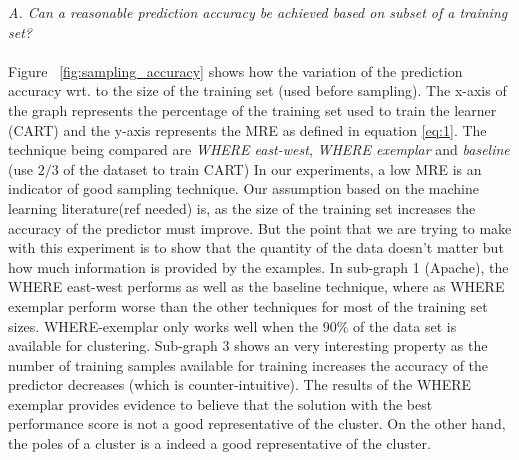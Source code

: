 \documentclass{sig-alternative}
\begin{document}
\textit{A. Can a reasonable prediction accuracy be achieved based on 
subset of a training set?}\\
\\
Figure ~\ref{fig:sampling_accuracy} shows how the variation of the  prediction accuracy wrt. to the size of the training set (used before sampling). The x-axis of the graph represents the percentage of the training set used to train the learner (CART) and the y-axis represents the MRE as defined in equation \ref{eq:1}. The technique being compared are \textit{WHERE east-west}, \textit{WHERE exemplar} and \textit{baseline} (use $2/3$ of the dataset to train CART) In our experiments, a low MRE is an indicator of good sampling technique. Our assumption based on the machine learning literature(ref needed) is, as the size of the training set increases the accuracy of the predictor must improve. But the point that we are trying to make with this experiment is to show that the quantity of the data doesn't matter but how much information is provided by the examples. In sub-graph 1 (Apache), the WHERE east-west performs as well as the baseline technique, where as WHERE exemplar perform worse than the other techniques for most of the training set sizes. WHERE-exemplar only works well when the 90\% of the data set is available for clustering. Sub-graph 3 shows an very interesting property as the number of training samples available for training increases the accuracy of the predictor decreases (which is counter-intuitive). The results of the WHERE exemplar provides evidence to believe that the solution with the best performance score is not a good representative of the cluster. On the other hand, the poles of a cluster is a indeed a good representative of the cluster.\\~\\
\end{document}

